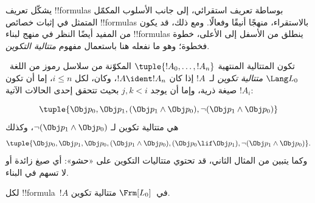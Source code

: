 \documentclass[../../../include/open-logic-section]{subfiles}
\begin{document}


يشكّل تعريف !!{formula}s بوساطة تعريف استقرائي، إلى جانب الأسلوب المكمّل
المتمثل في إثبات خصائص !!{formula}s بالاستقراء، منهجًا أنيقًا وفعالًا.
ومع ذلك، قد
يكون من المفيد أيضًا النظر في منهج لبناء !!{formula}s ينطلق من الأسفل
إلى الأعلى، خطوة فخطوة؛ وهو ما نفعله هنا باستعمال مفهوم
\emph{متتالية التكوين}.

\begin{defn}
تكون المتتالية المنتهية $\tuple{!A_0,\dotsc,!A_n}$ المكوّنة من سلاسل
رموز من اللغة~$\Lang L_0$ \emph{متتالية تكوين} لـ~$!A$ إذا كان
$!A \ident !A_n$، وكان، لكل $i \leq n$، إما أن تكون $!A_i$ صيغة ذرية،
وإما أن يوجد $j,k < i$ بحيث تتحقق إحدى الحالات الآتية:
\begin{enumerate}
\end{enumerate}
\end{defn}

\begin{ex}
\[
\tuple{
    \Obj p_0,
    \Obj p_1,
    (\Obj p_1 \land \Obj p_0),
    \lnot (\Obj p_1 \land \Obj p_0)
}
\]
هي متتالية تكوين لـ
$\lnot (\Obj p_1 \land \Obj p_0)$، وكذلك
\[
\tuple{
    \Obj p_0,
    \Obj p_1,
    \Obj p_0,
    (\Obj p_1 \land \Obj p_0),
    (\Obj p_0 \lif \Obj p_1),
    \lnot (\Obj p_1 \land \Obj p_0)
}.
\]
%
وكما يتبين من المثال الثاني، قد تحتوي متتاليات التكوين على «حشو»:
أي صيغ زائدة أو لا تسهم في البناء.
\end{ex}

\begin{prop}
لكل !!{formula}~$!A$ في~$\Frm[L_0]$ متتالية تكوين.
\end{prop}
\end{document}
